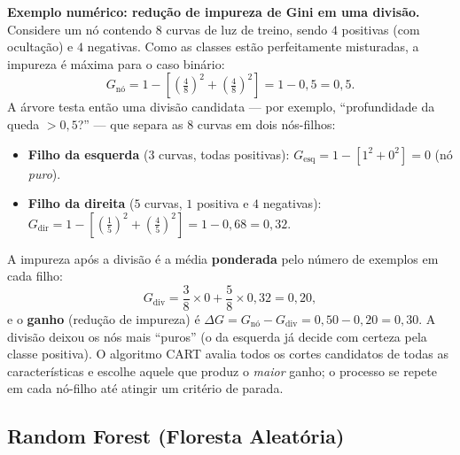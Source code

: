 \vspace{0.3cm}
\noindent\textbf{Exemplo numérico: redução de impureza de Gini em uma divisão.}
Considere um nó contendo $8$ curvas de luz de treino, sendo $4$ positivas (com ocultação) e $4$ negativas. Como as classes estão perfeitamente misturadas, a impureza é máxima para o caso binário:
\[
G_{\text{nó}} = 1 - \left[\left(\tfrac{4}{8}\right)^2 + \left(\tfrac{4}{8}\right)^2\right] = 1 - 0{,}5 = 0{,}5.
\]
A árvore testa então uma divisão candidata --- por exemplo, ``profundidade da queda $> 0{,}5$?'' --- que separa as $8$ curvas em dois nós-filhos:
\begin{itemize}
	\item \textbf{Filho da esquerda} ($3$ curvas, todas positivas): $G_{\text{esq}} = 1 - \left[1^2 + 0^2\right] = 0$ (nó \emph{puro}).
	\item \textbf{Filho da direita} ($5$ curvas, $1$ positiva e $4$ negativas): $G_{\text{dir}} = 1 - \left[\left(\tfrac{1}{5}\right)^2 + \left(\tfrac{4}{5}\right)^2\right] = 1 - 0{,}68 = 0{,}32$.
\end{itemize}
A impureza após a divisão é a média \textbf{ponderada} pelo número de exemplos em cada filho:
\[
G_{\text{div}} = \frac{3}{8}\times 0 + \frac{5}{8}\times 0{,}32 = 0{,}20,
\]
e o \textbf{ganho} (redução de impureza) é $\Delta G = G_{\text{nó}} - G_{\text{div}} = 0{,}50 - 0{,}20 = 0{,}30$. A divisão deixou os nós mais ``puros'' (o da esquerda já decide com certeza pela classe positiva). O algoritmo CART avalia todos os cortes candidatos de todas as características e escolhe aquele que produz o \emph{maior} ganho; o processo se repete em cada nó-filho até atingir um critério de parada.
\vspace{0.3cm}

\subsection{Random Forest (Floresta Aleatória)}

